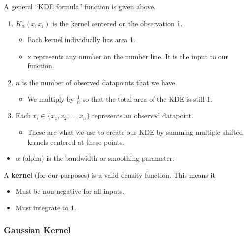 \documentclass[
  letterpaper,
  DIV=11,
  numbers=noendperiod]{scrreprt}
\providecommand{\tightlist}{%
  \setlength{\itemsep}{0pt}\setlength{\parskip}{0pt}}\usepackage{longtable,booktabs,array}
\begin{document}
A general ``KDE formula'' function is given above.

\begin{enumerate}
\def\labelenumi{\arabic{enumi}.}
\tightlist
\item
  \(K_{\alpha}(x, x_i)\) is the kernel centered on the observation
  \texttt{i}.

  \begin{itemize}
  \tightlist
  \item
    Each kernel individually has area 1.
  \item
    x represents any number on the number line. It is the input to our
    function.
  \end{itemize}
\item
  \(n\) is the number of observed datapoints that we have.

  \begin{itemize}
  \tightlist
  \item
    We multiply by \(\frac{1}{n}\) so that the total area of the KDE is
    still 1.
  \end{itemize}
\item
  Each \(x_i \in \{x_1, x_2, \dots, x_n\}\) represents an observed
  datapoint.

  \begin{itemize}
  \tightlist
  \item
    These are what we use to create our KDE by summing multiple shifted
    kernels centered at these points.
  \end{itemize}
\end{enumerate}

\begin{itemize}
\tightlist
\item
  \(\alpha\) (alpha) is the bandwidth or smoothing parameter.
\end{itemize}

A \textbf{kernel} (for our purposes) is a valid density function. This
means it:

\begin{itemize}
\tightlist
\item
  Must be non-negative for all inputs.
\item
  Must integrate to 1.
\end{itemize}

\subsubsection{Gaussian Kernel}\label{gaussian-kernel}
\end{document}
